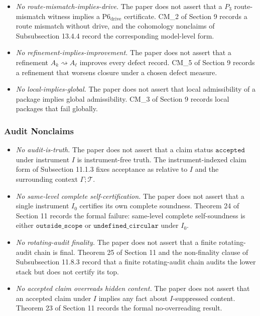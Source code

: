 \documentclass[11pt]{article}
\providecommand{\tightlist}{}
\theoremstyle{definition}
\begin{document}
\begin{itemize}
\tightlist
\item
  \emph{No route-mismatch-implies-drive.} The paper does not assert that a \(P_{3}\) route-mismatch witness implies a \(\mathrm{P6}_{\mathrm{drive}}\) certificate. CM\_2 of Section 9 records a route mismatch without drive, and the cohomology nonclaims of Subsubsection 13.4.4 record the corresponding model-level form.
\item
  \emph{No refinement-implies-improvement.} The paper does not assert that a refinement \(A_{k}\rightsquigarrow A_{\ell}\) improves every defect record. CM\_5 of Section 9 records a refinement that worsens closure under a chosen defect measure.
\item
  \emph{No local-implies-global.} The paper does not assert that local admissibility of a package implies global admissibility. CM\_3 of Section 9 records local packages that fail globally.
\end{itemize}

\subsubsection{Audit Nonclaims}

\begin{itemize}
\tightlist
\item
  \emph{No audit-is-truth.} The paper does not assert that a claim status \(\texttt{accepted}\) under instrument \(I\) is instrument-free truth. The instrument-indexed claim form of Subsection 11.1.3 fixes acceptance as relative to \(I\) and the surrounding context \(\Gamma;\mathcal T\).
\item
  \emph{No same-level complete self-certification.} The paper does not assert that a single instrument \(I_{0}\) certifies its own complete soundness. Theorem 24 of Section 11 records the formal failure: same-level complete self-soundness is either \(\texttt{outside\_scope}\) or \(\texttt{undefined\_circular}\) under \(I_{0}\).
\item
  \emph{No rotating-audit finality.} The paper does not assert that a finite rotating-audit chain is final. Theorem 25 of Section 11 and the non-finality clause of Subsubsection 11.8.3 record that a finite rotating-audit chain audits the lower stack but does not certify its top.
\item
  \emph{No accepted claim overreads hidden content.} The paper does not assert that an accepted claim under \(I\) implies any fact about \(I\)-suppressed content. Theorem 23 of Section 11 records the formal no-overreading result.
\end{itemize}
\end{document}
